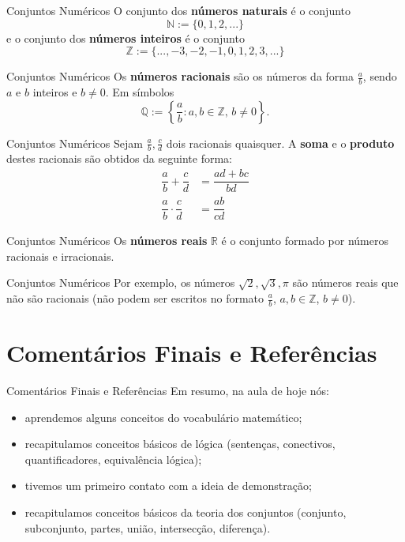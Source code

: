 \documentclass[10pt]{beamer}
\renewcommand{\indent}{\hspace*{2em}}
\theoremstyle{plain}
\begin{document}
\begin{frame}{Conjuntos Numéricos}
 \indent O conjunto dos \textbf{números naturais} é o conjunto
 $$\mathbb N:=\{0,1,2,...\}$$
 e o conjunto dos \textbf{números inteiros} é o conjunto
 $$\mathbb Z:=\{...,-3,-2,-1,0,1,2,3,...\}$$
\end{frame}

\begin{frame}{Conjuntos Numéricos}
 \indent Os \textbf{números racionais} são os números da forma $\frac{a}{b}$, sendo $a$ e $b$ inteiros e $b\ne0$. Em símbolos
 $$\mathbb Q:=\left\lbrace\dfrac{a}{b}:a,b\in\mathbb Z,\,b\ne0\right\rbrace.$$
\end{frame}

\begin{frame}{Conjuntos Numéricos}
 \indent Sejam $\frac{a}{b},\frac{c}{d}$ dois racionais quaisquer. A \textbf{soma} e o \textbf{produto} destes racionais são obtidos da seguinte forma:
 \begin{align*}
     \dfrac{a}{b}+\dfrac{c}{d}&=\dfrac{ad+bc}{bd} \\
     \dfrac{a}{b}\cdot\dfrac{c}{d}&=\dfrac{ab}{cd}
 \end{align*}
\end{frame}

\begin{frame}{Conjuntos Numéricos}
 \indent Os \textbf{números reais} $\mathbb R$ é o conjunto formado por números racionais e irracionais.
\end{frame}

\begin{frame}{Conjuntos Numéricos}
 \indent Por exemplo, os números $\sqrt{2},\sqrt{3},\pi$ são números reais que não são racionais (não podem ser escritos no formato $\frac{a}{b}$, $a,b\in\mathbb Z$, $b\ne0$).
\end{frame}

\section{Comentários Finais e Referências}

\begin{frame}{Comentários Finais e Referências}
\indent Em resumo, na aula de hoje nós:
\begin{itemize}
    \item aprendemos alguns conceitos do vocabulário matemático;
    \item recapitulamos conceitos básicos de lógica (sentenças, conectivos, quantificadores, equivalência lógica);
    \item tivemos um primeiro contato com a ideia de demonstração;
    \item recapitulamos conceitos básicos da teoria dos conjuntos (conjunto, subconjunto, partes, união, intersecção, diferença).
\end{itemize}
\end{frame}
\end{document}
